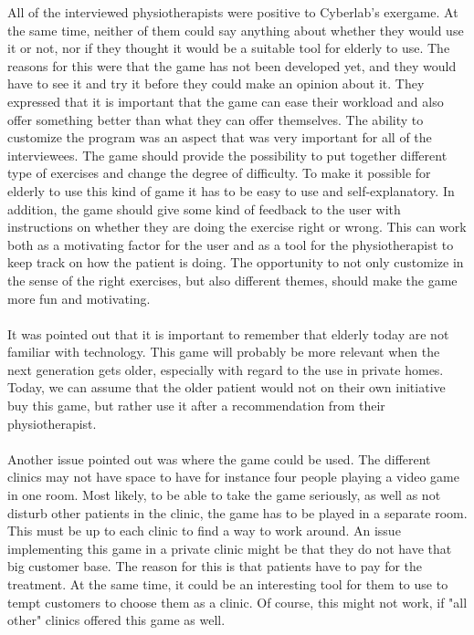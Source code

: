 All of the interviewed physiotherapists were positive to Cyberlab’s exergame. At the same time, neither of them could say anything about whether they would use it or not, nor if they thought it would be a suitable tool for elderly to use. The reasons for this were that the game has not been developed yet, and they would have to see it and try it before they could make an opinion about it. They expressed that it is important that the game can ease their workload and also offer something better than what they can offer themselves. The ability to customize the program was an aspect that was very important for all of the interviewees. The game should provide the possibility to put together different type of exercises and change the degree of difficulty. To make it possible for elderly to use this kind of game it has to be easy to use and self-explanatory. In addition, the game should give some kind of feedback to the user with instructions on whether they are doing the exercise right or wrong. This can work both as a motivating factor for the user and as a tool for the physiotherapist to keep track on how the patient is doing. The opportunity to not only customize in the sense of the right exercises, but also different themes, should make the game more fun and motivating. \\ \\
It was pointed out that it is important to remember that elderly today are not familiar with technology. This game will probably be more relevant when the next generation gets older, especially with regard to the use in private homes. Today, we can assume that the older patient would not on their own initiative buy this game, but rather use it after a recommendation from their physiotherapist. \\ \\
Another issue pointed out was where the game could be used. The different clinics may not have space to have for instance four people playing a video game in one room. Most likely, to be able to take the game seriously, as well as not disturb other patients in the clinic, the game has to be played in a separate room. This must be up to each clinic to find a way to work around. An issue implementing this game in a private clinic might be that they do not have that big customer base. The reason for this is that patients have to pay for the treatment. At the same time, it could be an interesting tool for them to use to tempt customers to choose them as a clinic. Of course, this might not work, if "all other" clinics offered this game as well. \\ \\
